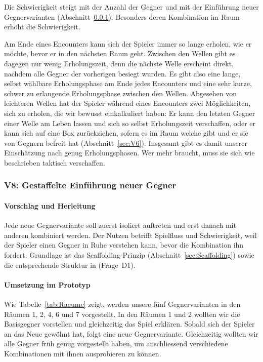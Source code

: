 \documentclass[../Main.tex]{subfiles}
\begin{document}
Die Schwierigkeit steigt mit der Anzahl der Gegner und mit der Einführung neuer Gegnervarianten (Abschnitt~\ref{sec:V8}). Besonders deren Kombination im Raum erhöht die Schwierigkeit.

Am Ende eines Encounters kann sich der Spieler immer so lange erholen, wie er möchte, bevor er in den nächsten Raum geht. Zwischen den Wellen gibt es dagegen nur wenig Erholungszeit, denn die nächste Welle erscheint direkt, nachdem alle Gegner der vorherigen besiegt wurden. Es gibt also eine lange, selbst wählbare Erholungsphase am Ende jedes Encounters und eine sehr kurze, schwer zu erlangende Erholungsphase zwischen den Wellen. Abgesehen von leichteren Wellen hat der Spieler während eines Encounters zwei Möglichkeiten, sich zu erholen, die wir bewusst einkalkuliert haben: Er kann den letzten Gegner einer Welle am Leben lassen und sich so selbst Erholungszeit verschaffen, oder er kann sich auf eine Box zurückziehen, sofern es im Raum welche gibt und er sie von Gegnern befreit hat (Abschnitt~\ref{sec:V6}). Insgesamt gibt es damit unserer Einschätzung nach genug Erholungsphasen. Wer mehr braucht, muss sie sich wie beschrieben taktisch verschaffen.

\subsubsection{V8: Gestaffelte Einführung neuer Gegner} \label{sec:V8}

\paragraph{Vorschlag und Herleitung}
Jede neue Gegnervariante soll zuerst isoliert auftreten und erst danach mit anderen kombiniert werden. Der Nutzen betrifft Spielfluss und Schwierigkeit, weil der Spieler einen Gegner in Ruhe verstehen kann, bevor die Kombination ihn fordert. Grundlage ist das Scaffolding-Prinzip (Abschnitt~\ref{sec:Scaffolding}) sowie die entsprechende Struktur in  (Frage~D1).

\paragraph{Umsetzung im Prototyp}
Wie Tabelle~\ref{tab:Raeume} zeigt, werden unsere fünf Gegnervarianten in den Räumen 1, 2, 4, 6 und 7 vorgestellt. In den Räumen 1 und 2 wollten wir die Basisgegner vorstellen und gleichzeitig das Spiel erklären. Sobald sich der Spieler an das Neue gewöhnt hat, folgt eine neue Gegnervariante. Gleichzeitig wollten wir alle Gegner früh genug vorgestellt haben, um anschliessend verschiedene Kombinationen mit ihnen ausprobieren zu können.
\end{document}
